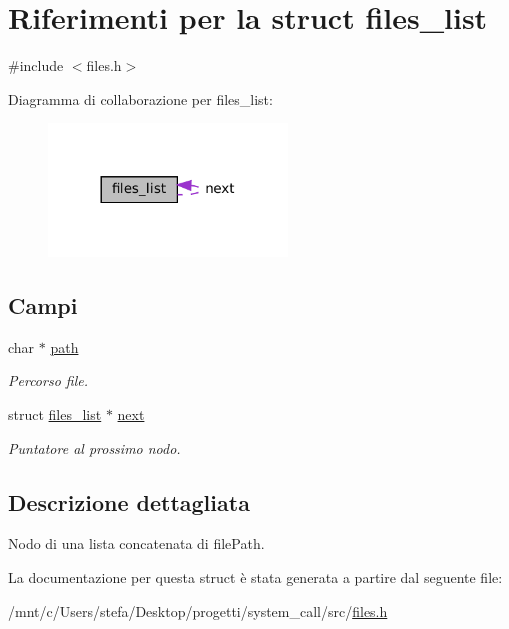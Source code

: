 \hypertarget{structfiles__list}{}\section{Riferimenti per la struct files\+\_\+list}
\label{structfiles__list}


{\ttfamily \#include $<$files.\+h$>$}



Diagramma di collaborazione per files\+\_\+list\+:\nopagebreak
\begin{figure}[H]
\begin{center}
\leavevmode
\includegraphics[width=180pt]{structfiles__list__coll__graph}
\end{center}
\end{figure}
\subsection*{Campi}
\begin{DoxyCompactItemize}
\item 
\mbox{\label{structfiles__list_a986ecc1174faf39b15c1ef655c2ed966}} 
char $\ast$ \hyperlink{structfiles__list_a986ecc1174faf39b15c1ef655c2ed966}{path}
\begin{DoxyCompactList}\small\item\em Percorso file. \end{DoxyCompactList}\item 
\mbox{\label{structfiles__list_a3cdd0098b7fb9589480f8a9facad90ce}} 
struct \hyperlink{structfiles__list}{files\+\_\+list} $\ast$ \hyperlink{structfiles__list_a3cdd0098b7fb9589480f8a9facad90ce}{next}
\begin{DoxyCompactList}\small\item\em Puntatore al prossimo nodo. \end{DoxyCompactList}\end{DoxyCompactItemize}


\subsection{Descrizione dettagliata}
Nodo di una lista concatenata di file\+Path. 

La documentazione per questa struct è stata generata a partire dal seguente file\+:\begin{DoxyCompactItemize}
\item 
/mnt/c/\+Users/stefa/\+Desktop/progetti/system\+\_\+call/src/\hyperlink{files_8h}{files.\+h}\end{DoxyCompactItemize}
